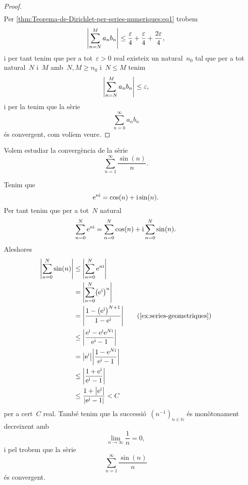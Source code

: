 \documentclass[../../main.tex]{subfiles}
\begin{document}
\begin{proof}
\begin{align*}
        \end{align*}
        Per \eqref{thm:Teorema-de-Dirichlet-per-series-numeriques:eq1} trobem
        \[
            \abs{\sum_{n=N}^{M}a_{n}b_{n}}\leq\frac{\varepsilon}{4}+\frac{\varepsilon}{4}+\frac{2\varepsilon}{4},
        \]
        i per tant tenim que per a tot~\(\varepsilon>0\) real existeix un natural~\(n_{0}\) tal que per a tot natural~\(N\) i~\(M\) amb~\(N,M\geq n_{0}\) i~\(N\leq M\) tenim
        \[
            \abs{\sum_{n=N}^{M}a_{n}b_{n}}\leq\varepsilon,
        \]
        i per la  tenim que la sèrie
        \[
            \sum_{n=0}^{\infty}a_{n}b_{n}
        \]
        és convergent, com volíem veure.
    \end{proof}
    \begin{example}%
        \label{ex:Teorema-de-Dirichlet-per-series-numeriques}
        Volem estudiar la convergència de la sèrie
        \[
            \sum_{n=1}^{\infty}\frac{\sin(n)}{n}.
        \]
    \end{example}
    \begin{solution} %
        Tenim que
        \[
            \mathrm{e}^{n\mathrm{i}}=\cos(n)+\mathrm{i}\sin(n).
        \]
        Per tant tenim que per a tot~\(N\) natural
        \[
            \sum_{n=0}^{N}\mathrm{e}^{n\mathrm{i}}=\sum_{n=0}^{N}\cos(n)+\mathrm{i}\sum_{n=0}^{N}\sin(n).
        \]
        Aleshores
        \begin{align*}
            \abs{\sum_{n=0}^{N}\sin(n)}&\leq\abs{\sum_{n=0}^{N}\e^{n\iu}} \\
            &=\abs{\sum_{n=0}^{N}\left(\e^{\iu}\right)^{n}} \\
            &=\abs{\frac{1-\left(\e^{\iu}\right)^{N+1}}{1-\e^{\iu}}} \tag{\ref{ex:series-geometriques}}\\
            &\leq\abs{\frac{\e^{\iu}-\e^{\iu}\e^{N\iu}}{\e^{\iu}-1}} \\
            &=\abs{\e^{\iu}}\abs{\frac{1-\e^{N\iu}}{\e^{\iu}-1}} \\
            &\leq\abs{\frac{1+\e^{\iu}}{\e^{\iu}-1}} \\
            &\leq\frac{1+\abs{\e^{\iu}}}{\abs{\e^{\iu}-1}}<C \\
        \end{align*}
        per a cert~\(C\) real.
        També tenim que la successió~\((n^{-1})_{n\in\mathbb{N}}\) és monòtonament decreixent amb
        \[
            \lim_{n\to\infty}\frac{1}{n}=0,
        \]
        i pel  trobem que la sèrie
        \[
            \sum_{n=1}^{\infty}\frac{\sin(n)}{n}
        \]
        és convergent.
    \end{solution} %
\end{document}

